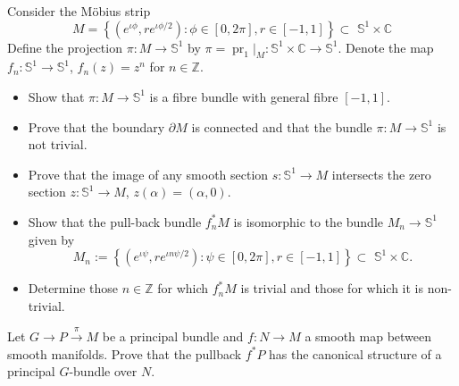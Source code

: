 \begin{exercise}
    Consider the Möbius strip
    \begin{equation*}
        M=\left\{ \left( e^{\iota \phi},re^{\iota \phi /2} \right) 
        :\phi \in \left[ 0,2\pi \right] ,r\in \left[ -1,1 \right] \right\} 
        \subset \,\,\mathbb{S} ^1\times \mathbb{C} 
    \end{equation*}
    Define the projection $\pi:M\to \mathbb{S}^1$ 
    by $\pi=\operatorname{pr}_1|_M:
    \mathbb{S}^1\times\mathbb{C}\to\mathbb{S}^1$.
    Denote the map $f_n:\mathbb{S}^1\to\mathbb{S}^1$,
    $f_n(z)=z^n$ for $n\in \mathbb{Z}$.

    \begin{itemize}
        \item Show that $\pi:M\to \mathbb{S}^1$ is
        a fibre bundle with general fibre $[-1,1]$.

        \item Prove that the boundary $\partial M$ is connected
        and that the bundle $\pi:M\to \mathbb{S}^1$ is not trivial.

        \item Prove that the image of any smooth section
        $s:\mathbb{S}^1\to M$ intersects the zero section
        $z:\mathbb{S}^1\to M$, $z(\alpha)=(\alpha,0)$.

        \item Show that the pull-back bundle $f^{*}_{n} M$
        is isomorphic to the bundle $M_n\to \mathbb{S}^1$ given by
        \begin{equation*}
            M_n:=\left\{ 
            \left( e^{\iota \psi},re^{\iota n\psi /2} \right) 
            :\psi \in \left[ 0,2\pi \right] ,r\in \left[ -1,1 \right] \right\} 
            \subset \,\,\mathbb{S} ^1\times \mathbb{C}.
        \end{equation*}

        \item Determine those $n\in \mathbb{Z}$ for which $f^*_n M$
        is trivial and those for which it is non-trivial.
    \end{itemize}
\end{exercise}


\begin{exercise}
    Let $G\to P\stackrel{\pi}{\rightarrow} M$ be a principal bundle
    and $f:N\to M$ a smooth map between smooth manifolds.
    Prove that the pullback $f^* P$ has the canonical structure
    of a principal $G$-bundle over $N$.
\end{exercise}



